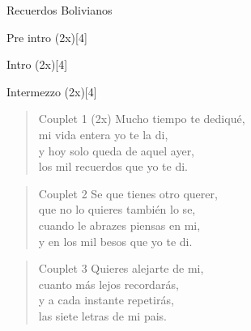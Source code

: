\begin{song}[huayno]{Recuerdos Bolivianos}

\begin{instrumental}{Pre intro (2x)}[4]
   
   
\end{instrumental}

\begin{instrumental}{Intro (2x)}[4]
   
   
\end{instrumental}

\begin{instrumental}{Intermezzo (2x)}[4]
    
    
\end{instrumental}

\begin{verse}{Couplet 1 (2x)}
Mucho tiempo te dediqué,\\
mi vida entera yo te la di,\\
y hoy solo queda de aquel ayer,\\
los mil recuerdos que yo te di.
\end{verse}

\begin{verse}{Couplet 2}
Se que tienes otro querer,\\
que no lo quieres también lo se,\\
cuando le abrazes piensas en mi,\\
y en los mil besos que yo te di.
\end{verse}

\begin{verse}{Couplet 3}
Quieres alejarte de mi,\\
cuanto más lejos recordarás,\\
y a cada instante repetirás,\\
las siete letras de mi pais.
\end{verse}


\end{song}

